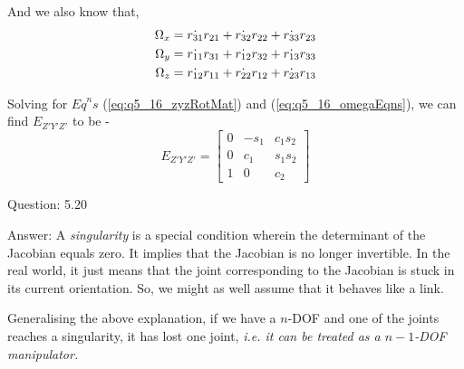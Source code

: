 \documentclass[a4paper]{article}
\begin{document}
\begin{qalist}
			And we also know that, 
			\begin{align}  \label{eq:q5_16_omegaEqns}
				{\Omega}_{x} &= \dot{{r}_{31}}{r}_{21} +  \dot{{r}_{32}}{r}_{22} + \dot{{r}_{33}}{r}_{23} \notag \\
				{\Omega}_{y} &= \dot{{r}_{11}}{r}_{31} + \dot{{r}_{12}}{r}_{32} + \dot{{r}_{13}}{r}_{33}  \\
				{\Omega}_{z} &= \dot{{r}_{12}}{r}_{11} + \dot{{r}_{22}}{r}_{12} + \dot{{r}_{23}}{r}_{13} \notag 
			\end{align}
			
			Solving for ${Eq}^{n}s$ (\ref{eq:q5_16_zyzRotMat}) and (\ref{eq:q5_16_omegaEqns}), we can find ${E}_{Z'Y'Z'}$ to be - 
			\begin{equation}
				{E}_{Z'Y'Z'} = \begin{bmatrix}0 & -{s}_{1} & {c}_{1}{s}_{2} \\ 0 & {c}_{1} & {s}_{1}{s}_{2} \\ 1 & 0 & {c}_{2}\end{bmatrix}
			\end{equation}
		
		\item[Question: 5.20] \setcounter{equation}{0} %
		\item[Answer:] A \emph{singularity} is a special condition wherein the determinant of the Jacobian equals zero. It implies that the Jacobian is no longer invertible. In the real world, it just means that the joint corresponding to the Jacobian is stuck in its current orientation. So, we might as well assume that it behaves like a link. 
		
			Generalising the above explanation, if we have a $n$-DOF and one of the joints reaches a singularity, it has lost one joint, \emph{i.e. it can be treated as a $n-1$-DOF manipulator.}
	\end{qalist}
\end{document}
